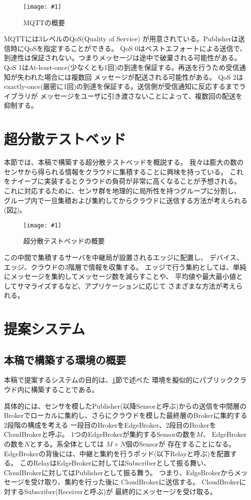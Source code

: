 \documentclass[submit,techrep]{ipsj}
\newcommand{\reffig}[1]{図\ref{#1}}
\newcommand{\epsfig}[4]{
\begin{figure}[tb]
  \begin{center}
    \texttt{[image: \#1]}
  \end{center}
  \caption{#3}
  \label{#4}
\end{figure}}
\begin{document}
\epsfig{figs/mqtt.pdf}{width=8.0cm}{MQTTの概要}{mqtt}

MQTTには3レベルのQoS(Quality of Service) が用意されている。Publisherは送信時にQoSを指定することができる。
QoS 0はベストエフォートによる送信で、到達性は保証されない。つまりメッセージは途中で破棄される可能性がある。
QoS 1はAt-least-once(少なくとも1回)の到達を保証する。再送を行うため受信通知が失われた場合には複数回
メッセージが配送される可能性がある。
QoS 2はexactly-once(厳密に1回)の到達を保証する。送信側が受信通知に反応するまでライブラリが
メッセージをユーザに引き渡さないことによって、複数回の配送を抑制する。


\section{超分散テストベッド}\label{sec:testbed}
本節では、本稿で構築する超分散テストベッドを概説する。
我々は膨大の数のセンサから得られる情報をクラウドに集積することに興味を持っている。
これをナイーブに実装するとクラウドの負荷が非常に高くなることが予想される。
これに対応するために、センサ群を地理的に局所性を持つグループに分割し、
グループ内で一旦集積および集約してからクラウドに送信する方法が考えられる(\reffig{continuum})。

\epsfig{figs/proposed.pdf}{width=8.5cm}{超分散テストベッドの概要}{continuum}

この中間で集積するサーバを中継局が設置されるエッジに配置し、
デバイス、エッジ、クラウドの3階層で情報を収集する。
エッジで行う集約としては、単純にメッセージを集約してメッセージ数を減らすことや、
平均値や最大最小値としてサマライズするなど、アプリケーションに応じて
さまざまな方法が考えられる。



\section{提案システム}\label{sec:proposal}

\subsection{本稿で構築する環境の概要}
本稿で提案するシステムの目的は、\ref{sec:testbed}節で述べた
環境を擬似的にパブリッククラウド内に構築することである。

具体的には、センサを模したPublisher(以降Sensorと呼ぶ)からの送信を中間層の
Brokerでローカルに集約し、さらにクラウドを模した最終層のBrokerに集約する
2段階の構成を考える
一段目のBrokerをEdgeBroker、2段目のBrokerをCloudBrokerと呼ぶ。
1つのEdgeBrokerが集約するSensorの数を$M$、
EdgeBrokerの数を$N$とする。系全体としては $M \times N$個のSensorが
存在することになる。
EdgeBrokerの背後には、中継と集約を行うポッド(以下Relayと呼ぶ)を配置する。
このRelayはEdgeBrokerに対してはSubscriberとして振る舞い、
CloudBrokerに対してはPublisherとして振る舞う。
つまり、EdgeBrokerからメッセージを受け取り、集約を行った後に
CloudBrokerに送信する。
CloudBrokerに対するSubscriber(Receiverと呼ぶ)が
最終的にメッセージを受け取る。
\end{document}
